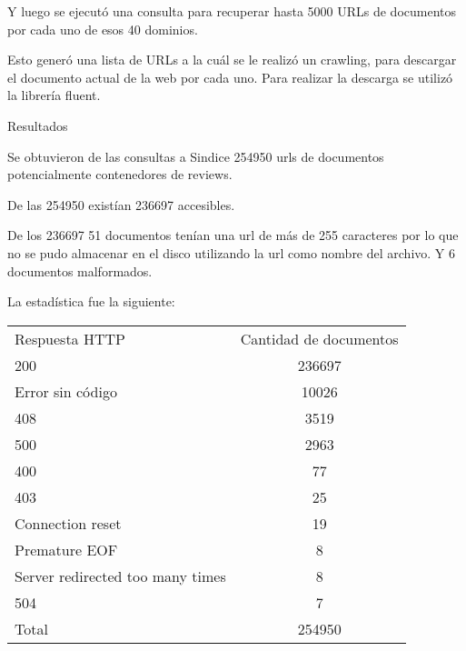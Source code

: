 Y luego se ejecutó una consulta para recuperar hasta 5000 URLs de documentos por cada uno de esos 40 dominios.

Esto generó una lista de URLs a la cuál se le realizó un crawling, para descargar el documento actual de la web por cada uno. Para realizar la descarga se utilizó la librería fluent.



Resultados

Se obtuvieron de las consultas a Sindice 254950 urls de documentos potencialmente contenedores de reviews.

De las 254950 existían 236697 accesibles.

De los 236697 51 documentos tenían una url de más de 255 caracteres por lo que no se pudo almacenar en el disco utilizando la url como nombre del archivo. Y 6 documentos malformados.

La estadística fue la siguiente:

\begin{tabular}{| l | c | }
   Respuesta HTTP & Cantidad de documentos \\
   200 & 236697 \\
   Error sin código & 10026 \\
   408 & 3519 \\
   500 & 2963 \\
   400 & 77 \\
   403 & 25 \\
   Connection reset & 19 \\
   Premature EOF & 8 \\
   Server redirected too many times & 8 \\
   504 & 7 \\
   Total & 254950 \\
 \end{tabular}

